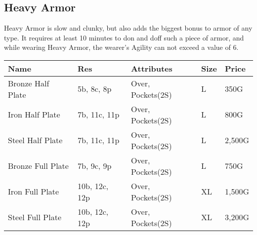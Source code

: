 \subsection{Heavy Armor}\label{subsec:heavyArmor}
Heavy Armor is slow and clunky, but also adds the biggest bonus to armor of any type.
It requires at least 10 minutes to don and doff such a piece of armor, and while wearing Heavy Armor, the wearer's Agility can not exceed a value of 6.
\begin{longtable}{p{3cm} | p{1.5cm} | p{5cm} | p{1cm} | p{1.5cm}}
	Name & Res &  Attributes & Size & Price\\ \hline
	Bronze Half Plate & 5b, 8c, 8p & Over, Pockets(2S) & L & 350G\\
	
	Iron Half Plate  & 7b, 11c, 11p & Over, Pockets(2S) & L & 800G\\

	Steel Half Plate  & 7b, 11c, 11p & Over, Pockets(2S) & L & 2,500G\\

	Bronze Full Plate & 7b, 9c, 9p & Over, Pockets(2S) & L & 750G\\

	Iron Full Plate  & 10b, 12c, 12p & Over, Pockets(2S) & XL & 1,500G\\

	Steel Full Plate  & 10b, 12c, 12p & Over, Pockets(2S) & XL & 3,200G\\
\end{longtable}